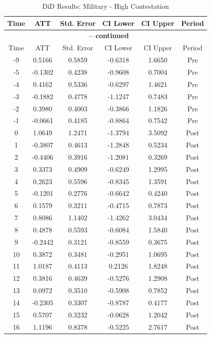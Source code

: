 \documentclass[bibtex]{article}
\begin{document}
{\begin{longtable}{cccccc}
\caption{DiD Results: Military - High Contestation} \label{tab:mil_high} \\
\toprule
Time & ATT & Std. Error & CI Lower & CI Upper & Period \\
\midrule
\endfirsthead
\multicolumn{6}{c}{{\bfseries \tablename\ \thetable{} -- continued}} \\
\toprule
Time & ATT & Std. Error & CI Lower & CI Upper & Period \\
\midrule
\endhead
-9 & 0.5166 & 0.5859 & -0.6318 & 1.6650 & Pre \\
-5 & -0.1302 & 0.4238 & -0.9608 & 0.7004 & Pre \\
-4 & 0.4162 & 0.5336 & -0.6297 & 1.4621 & Pre \\
-3 & -0.1882 & 0.4778 & -1.1247 & 0.7483 & Pre \\
-2 & 0.3980 & 0.4003 & -0.3866 & 1.1826 & Pre \\
-1 & -0.0661 & 0.4185 & -0.8864 & 0.7542 & Pre \\
0 & 1.0649 & 1.2471 & -1.3794 & 3.5092 & Post \\
1 & -0.3807 & 0.4613 & -1.2848 & 0.5234 & Post \\
2 & -0.4406 & 0.3916 & -1.2081 & 0.3269 & Post \\
3 & 0.3373 & 0.4909 & -0.6249 & 1.2995 & Post \\
4 & 0.2623 & 0.5596 & -0.8345 & 1.3591 & Post \\
5 & -0.1201 & 0.2776 & -0.6642 & 0.4240 & Post \\
6 & 0.1579 & 0.3211 & -0.4715 & 0.7873 & Post \\
7 & 0.8086 & 1.1402 & -1.4262 & 3.0434 & Post \\
8 & 0.4878 & 0.5593 & -0.6084 & 1.5840 & Post \\
9 & -0.2442 & 0.3121 & -0.8559 & 0.3675 & Post \\
10 & 0.3872 & 0.3481 & -0.2951 & 1.0695 & Post \\
11 & 1.0187 & 0.4113 & 0.2126 & 1.8248 & Post \\
12 & 0.3816 & 0.4639 & -0.5276 & 1.2908 & Post \\
13 & 0.0972 & 0.3510 & -0.5908 & 0.7852 & Post \\
14 & -0.2305 & 0.3307 & -0.8787 & 0.4177 & Post \\
15 & 0.5707 & 0.3232 & -0.0628 & 1.2042 & Post \\
16 & 1.1196 & 0.8378 & -0.5225 & 2.7617 & Post \\

\end{longtable}}
\end{document}
